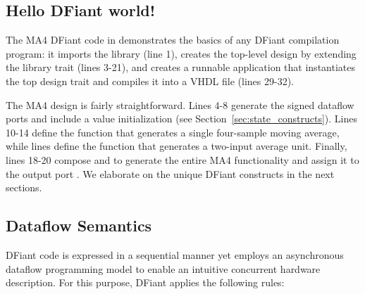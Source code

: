 \begin{table}[t!]
  \captionsetup{justification=centering}
\label{fig:MADraw}
\end{table}

\subsection{Hello DFiant world!}
The MA4 DFiant code in  demonstrates the basics of any DFiant compilation program: it imports the  library (line 1), creates the top-level design by extending the  library trait (lines 3-21), and creates a runnable application that instantiates the top design trait and compiles it into a VHDL file (lines 29-32). 

The MA4 design is fairly straightforward. Lines 4-8 generate the signed dataflow ports and include a  value initialization (see Section~\ref{sec:state_constructs}). 
Lines 10-14 define the function  that generates a single four-sample moving average, while lines  define the function  that generates a two-input average unit. Finally, lines 18-20 compose  and  to generate the entire MA4 functionality and assign it to the output port . We elaborate on the unique DFiant constructs in the next sections.


\subsection{Dataflow Semantics}
DFiant code is expressed in a sequential manner yet employs an asynchronous dataflow programming model to enable an intuitive concurrent hardware description. For this purpose, DFiant applies the following rules:

